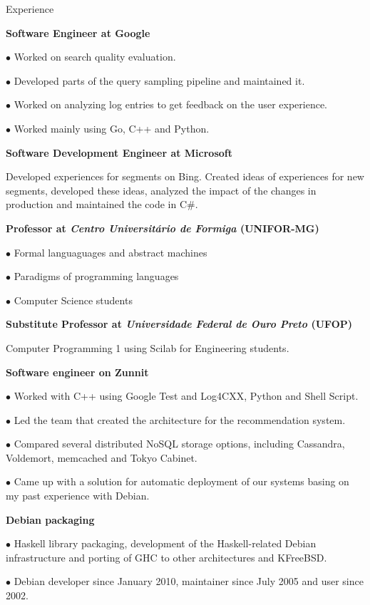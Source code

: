 \begin {rubric} {Experience}

\entry* [11/2014-\ldots]
\textbf {Software Engineer at Google}

$\bullet$ Worked on search quality evaluation.

$\bullet$ Developed parts of the query sampling pipeline and maintained it.

$\bullet$ Worked on analyzing log entries to get feedback on the user experience.

$\bullet$ Worked mainly using Go, C++ and Python.

\entry* [12/2012-09/2014]
\textbf {Software Development Engineer at Microsoft}

Developed experiences for segments on Bing.  Created ideas of experiences for new segments, developed these ideas, analyzed the impact of the changes in production and maintained the code in C\#.

\entry* [10/2012-12/2012]
\textbf {Professor at \emph{Centro Universitário de Formiga} (UNIFOR-MG)}

$\bullet$ Formal languaguages and abstract machines

$\bullet$ Paradigms of programming languages

$\bullet$ Computer Science students

\entry* [02/2012-11/2012]
\textbf {Substitute Professor at \emph{Universidade Federal de Ouro Preto} (UFOP)}

Computer Programming 1 using Scilab for Engineering students.

\entry* [06/2011-03/2012]
\textbf {Software engineer on Zunnit}

$\bullet$ Worked with C++ using Google Test and Log4CXX, Python and Shell Script.

$\bullet$ Led the team that created the architecture for the recommendation
system.

$\bullet$ Compared several distributed NoSQL storage options, including
Cassandra, Voldemort, memcached and Tokyo Cabinet.

$\bullet$ Came up with a solution for automatic deployment of our systems basing
on my past experience with Debian.

\entry* [2005-2011]
\textbf {Debian packaging}

$\bullet$ Haskell library packaging, development of the Haskell-related Debian
infrastructure and porting of GHC to other architectures and KFreeBSD.

$\bullet$ Debian developer since January 2010, maintainer since July 2005 and
user since 2002.


\end{rubric}
